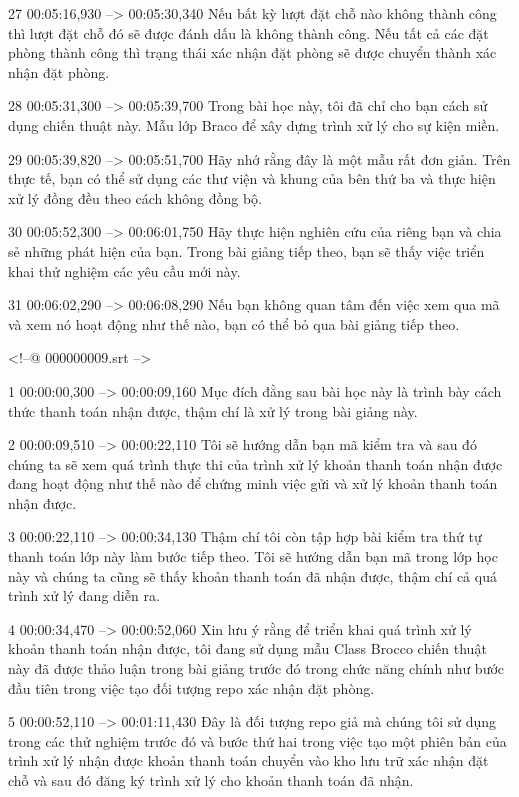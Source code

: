 27
00:05:16,930 --> 00:05:30,340
Nếu bất kỳ lượt đặt chỗ nào không thành công thì lượt đặt chỗ đó sẽ được đánh dấu là không thành công.  Nếu tất cả các đặt phòng thành công thì trạng thái xác nhận đặt phòng sẽ được chuyển thành xác nhận đặt phòng.

28
00:05:31,300 --> 00:05:39,700
Trong bài học này, tôi đã chỉ cho bạn cách sử dụng chiến thuật này.  Mẫu lớp Braco để xây dựng trình xử lý cho sự kiện miền.

29
00:05:39,820 --> 00:05:51,700
Hãy nhớ rằng đây là một mẫu rất đơn giản.  Trên thực tế, bạn có thể sử dụng các thư viện và khung của bên thứ ba và thực hiện xử lý đồng đều theo cách không đồng bộ.

30
00:05:52,300 --> 00:06:01,750
Hãy thực hiện nghiên cứu của riêng bạn và chia sẻ những phát hiện của bạn.  Trong bài giảng tiếp theo, bạn sẽ thấy việc triển khai thử nghiệm các yêu cầu mới này.

31
00:06:02,290 --> 00:06:08,290
Nếu bạn không quan tâm đến việc xem qua mã và xem nó hoạt động như thế nào, bạn có thể bỏ qua bài giảng tiếp theo.

<!--@ 000000009.srt -->

1
00:00:00,300 --> 00:00:09,160
Mục đích đằng sau bài học này là trình bày cách thức thanh toán nhận được, thậm chí là xử lý trong bài giảng này.

2
00:00:09,510 --> 00:00:22,110
Tôi sẽ hướng dẫn bạn mã kiểm tra và sau đó chúng ta sẽ xem quá trình thực thi của trình xử lý khoản thanh toán nhận được đang hoạt động như thế nào để chứng minh việc gửi và xử lý khoản thanh toán nhận được.

3
00:00:22,110 --> 00:00:34,130
Thậm chí tôi còn tập hợp bài kiểm tra thứ tự thanh toán lớp này làm bước tiếp theo.  Tôi sẽ hướng dẫn bạn mã trong lớp học này và chúng ta cũng sẽ thấy khoản thanh toán đã nhận được, thậm chí cả quá trình xử lý đang diễn ra.

4
00:00:34,470 --> 00:00:52,060
Xin lưu ý rằng để triển khai quá trình xử lý khoản thanh toán nhận được, tôi đang sử dụng mẫu Class Brocco chiến thuật này đã được thảo luận trong bài giảng trước đó trong chức năng chính như bước đầu tiên trong việc tạo đối tượng repo xác nhận đặt phòng.

5
00:00:52,110 --> 00:01:11,430
Đây là đối tượng repo giả mà chúng tôi sử dụng trong các thử nghiệm trước đó và bước thứ hai trong việc tạo một phiên bản của trình xử lý nhận được khoản thanh toán chuyển vào kho lưu trữ xác nhận đặt chỗ và sau đó đăng ký trình xử lý cho khoản thanh toán đã nhận.

